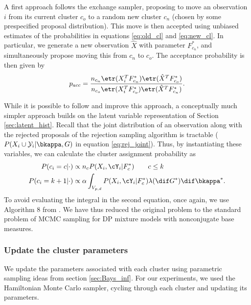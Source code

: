 A first approach follows the exchange sampler, proposing to move an observation $i$ from its current cluster $c_{o}$ to a random new cluster $c_{n}$
(chosen by some prespecified proposal distribution). 
This move is then accepted using unbiased estimates of the probabilities in equations \eqref{eq:old_cl} and \eqref{eq:new_cl}.
In particular, we generate a new observation $\hat{X}$ with parameter $F^*_{c_n}$, and simultaneously propose moving this from
$c_n$ to $c_o$. The acceptance probability is then given by
\begin{align}
 p_{acc} = \frac{n_{c_n} \etr(X_i^T F^*_{c_n}) \etr(\hat{X}^T F^*_{c_o})} {n_{c_o} \etr(X_i^T F^*_{c_o}) \etr(\hat{X}^T F^*_{c_n})}.
\end{align}

While it is possible to follow and improve this approach, a conceptually much simpler approach builds on the latent variable representation of 
Section \ref{sec:latent_hist}. Recall that the joint distribution of an observation along with the rejected proposals of the rejection sampling algorithm
is tractable ($P(X_i \cup \mathcal{Y}_i|\bkappa, G)$ in equation \eqref{eq:rej_joint}). Thus, by instantiating these variables, we can calculate the cluster assignment probability as
  \begin{align}
    P(c_i = c  |\cdot) & \propto n_c P(X_i,\cY_i| F^*_c) \qquad c \le k \label{eq:old_cl1}\\
    P(c_i = k+1|\cdot) & \propto \alpha \int_{V_{p,d}} P(X_i,\cY_i| F^*_c)\lambda(\dif G^*) \dif\bkappa^*. \label{eq:new_cl1}
  \end{align}
To avoid evaluating the integral in the second equation, once again, we use Algorithm 8 from \cite{Neal2010}. We have thus reduced the original problem
to the standard problem of MCMC sampling for DP mixture models with nonconjugate base measures.
\subsubsection{Update the cluster parameters}
  We update the parameters associated with each cluster using parametric sampling ideas from section \ref{sec:Bays_inf}. For our experiments, we used the Hamiltonian Monte Carlo
sampler, cycling through each cluster and updating its parameters.
